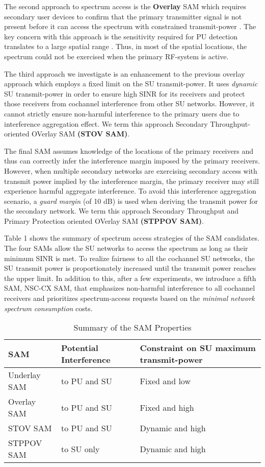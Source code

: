 \documentclass[12pt, draftclsnofoot, onecolumn]{IEEEtran}
\newcommand{\mycomment}[1]{}
\begin{document}
The second approach to spectrum access is the \textbf{Overlay} SAM which requires secondary user devices to confirm that the primary transmitter signal is not present before it can access the spectrum with constrained transmit-power \cite{dsa_survey}. The key concern with this approach is the sensitivity required for PU detection translates to a large spatial range \cite{oms2_sca}. Thus, in most of the spatial locations, the spectrum could not be exercised when the primary RF-system is active.  

The third approach we investigate is an enhancement to the previous overlay approach which employs a fixed limit on the SU  transmit-power. It uses \textit{dynamic} SU transmit-power in order to ensure high SINR for its receivers and protect those receivers from cochannel interference from other SU networks. However, it cannot strictly ensure non-harmful interference to the primary  users due to interference aggregation effect. We term this approach Secondary Throughput-oriented OVerlay SAM \textbf{(STOV SAM)}.

The final SAM assumes knowledge of the locations of the primary receivers and thus can correctly infer the interference margin imposed by the primary receivers. However, when multiple secondary networks are exercising secondary access with transmit power implied by the interference margin, the primary receiver may still experience harmful aggregate interference. To avoid this interference aggregation scenario, a \textit{guard margin} (of 10 dB) is used when deriving the transmit power for the secondary network.  We term this approach Secondary Throughput and Primary Protection oriented OVerlay SAM \textbf{(STPPOV SAM)}.

Table 1 \mycomment{\ref{table:SAMCandSum}} shows the summary of spectrum access strategies of the SAM candidates. The four SAMs allow the SU networks to access the spectrum as long as their minimum SINR is met. To realize fairness to all the cochannel SU networks, the SU transmit power is proportionately increased until the transmit power reaches the upper limit. In addition to this, after a few experiments, we introduce a fifth SAM, NSC-CX SAM, that emphasizes non-harmful interference to all cochannel receivers and prioritizes spectrum-access requests based on the \textit{minimal network spectrum consumption} costs.

\begin{table}[h!b!p!]
\label{table:SAMCandSum}
\caption{Summary of the SAM Properties}
\centering
\begin{tabular}{lll}
\hline
SAM & Potential Interference & Constraint on SU maximum transmit-power\\
\hline
Underlay SAM  & to PU and SU & Fixed and low\\
Overlay SAM & to PU and SU & Fixed and high\\
STOV SAM  & to PU and SU & Dynamic and high\\
STPPOV SAM  & to SU only & Dynamic and high\\
\hline
\end{tabular}
\end{table}
\end{document}
